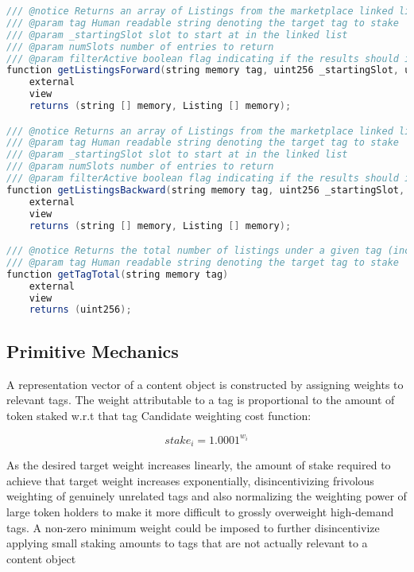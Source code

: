 \begin{lstlisting}[language=Java, caption=a minimal interface for reading and writing to the global ranking namespace]
/// @notice Returns an array of Listings from the marketplace linked list from highest to lowest ranked
/// @param tag Human readable string denoting the target tag to stake
/// @param _startingSlot slot to start at in the linked list
/// @param numSlots number of entries to return
/// @param filterActive boolean flag indicating if the results should include expired listings (false) or not (true)
function getListingsForward(string memory tag, uint256 _startingSlot, uint256 numSlots, bool filterActive) 
    external 
    view 
    returns (string [] memory, Listing [] memory);

/// @notice Returns an array of Listings from the marketplace linked list from lowest to highest ranked
/// @param tag Human readable string denoting the target tag to stake
/// @param _startingSlot slot to start at in the linked list
/// @param numSlots number of entries to return
/// @param filterActive boolean flag indicating if the results should include expired listings (false) or not (true)
function getListingsBackward(string memory tag, uint256 _startingSlot, uint256 numSlots, bool filterActive);
    external 
    view 
    returns (string [] memory, Listing [] memory);

/// @notice Returns the total number of listings under a given tag (including expired listings which have not been removed)
/// @param tag Human readable string denoting the target tag to stake
function getTagTotal(string memory tag)
    external 
    view 
    returns (uint256);
\end{lstlisting}

\subsection{Primitive Mechanics}
\label{PrimitiveMechanics}
A representation vector of a content object is constructed by assigning weights to relevant tags. 
The weight attributable to a tag is proportional to the amount of token staked w.r.t that tag
Candidate weighting cost function: 

\begin{equation}
    stake_i = 1.0001^{w_i}
\end{equation}

As the desired target weight increases linearly, the amount of stake required to achieve that target weight increases exponentially, disincentivizing frivolous weighting of genuinely unrelated tags and also normalizing the weighting power of large token holders to make it more difficult to grossly overweight high-demand tags. 
A non-zero minimum weight could be imposed to further disincentivize applying small staking amounts to tags that are not actually relevant to a content object

